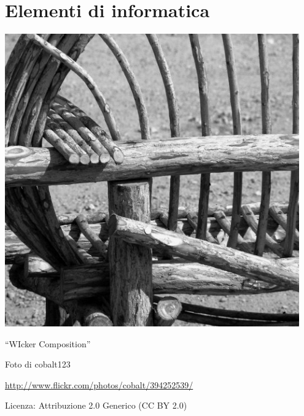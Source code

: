 
\part{Elementi di informatica}
\includegraphics[width=0.95\textwidth]{img/wiccom.jpg}
  \begin{center}
    {\large ``WIcker Composition''}\par
    Foto di cobalt123\par
    \url{http://www.flickr.com/photos/cobalt/394252539/}\par
    Licenza: Attribuzione 2.0 Generico (CC BY 2.0)
  \end{center}
\clearpage
\cleardoublepage